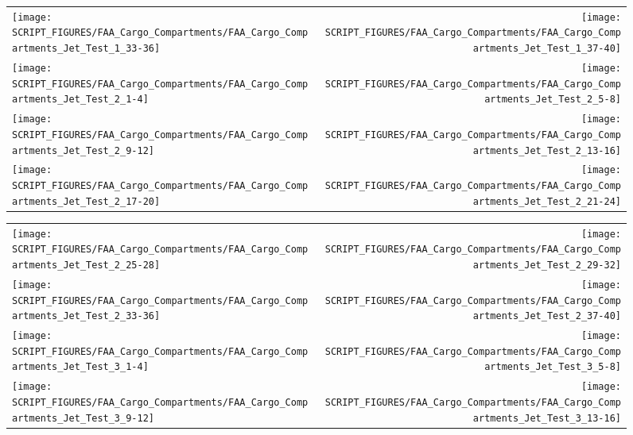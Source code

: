 \begin{figure}[p]
\begin{tabular*}{\textwidth}{l@{\extracolsep{\fill}}r}
\texttt{[image: SCRIPT\_FIGURES/FAA\_Cargo\_Compartments/FAA\_Cargo\_Compartments\_Jet\_Test\_1\_33-36]} &
\texttt{[image: SCRIPT\_FIGURES/FAA\_Cargo\_Compartments/FAA\_Cargo\_Compartments\_Jet\_Test\_1\_37-40]} \\
\texttt{[image: SCRIPT\_FIGURES/FAA\_Cargo\_Compartments/FAA\_Cargo\_Compartments\_Jet\_Test\_2\_1-4]} &
\texttt{[image: SCRIPT\_FIGURES/FAA\_Cargo\_Compartments/FAA\_Cargo\_Compartments\_Jet\_Test\_2\_5-8]} \\
\texttt{[image: SCRIPT\_FIGURES/FAA\_Cargo\_Compartments/FAA\_Cargo\_Compartments\_Jet\_Test\_2\_9-12]} &
\texttt{[image: SCRIPT\_FIGURES/FAA\_Cargo\_Compartments/FAA\_Cargo\_Compartments\_Jet\_Test\_2\_13-16]} \\
\texttt{[image: SCRIPT\_FIGURES/FAA\_Cargo\_Compartments/FAA\_Cargo\_Compartments\_Jet\_Test\_2\_17-20]} &
\texttt{[image: SCRIPT\_FIGURES/FAA\_Cargo\_Compartments/FAA\_Cargo\_Compartments\_Jet\_Test\_2\_21-24]}
\end{tabular*}
\label{FAA_Cargo_HGL_2}
\end{figure}

\begin{figure}[p]
\begin{tabular*}{\textwidth}{l@{\extracolsep{\fill}}r}
\texttt{[image: SCRIPT\_FIGURES/FAA\_Cargo\_Compartments/FAA\_Cargo\_Compartments\_Jet\_Test\_2\_25-28]} &
\texttt{[image: SCRIPT\_FIGURES/FAA\_Cargo\_Compartments/FAA\_Cargo\_Compartments\_Jet\_Test\_2\_29-32]} \\
\texttt{[image: SCRIPT\_FIGURES/FAA\_Cargo\_Compartments/FAA\_Cargo\_Compartments\_Jet\_Test\_2\_33-36]} &
\texttt{[image: SCRIPT\_FIGURES/FAA\_Cargo\_Compartments/FAA\_Cargo\_Compartments\_Jet\_Test\_2\_37-40]} \\
\texttt{[image: SCRIPT\_FIGURES/FAA\_Cargo\_Compartments/FAA\_Cargo\_Compartments\_Jet\_Test\_3\_1-4]} &
\texttt{[image: SCRIPT\_FIGURES/FAA\_Cargo\_Compartments/FAA\_Cargo\_Compartments\_Jet\_Test\_3\_5-8]} \\
\texttt{[image: SCRIPT\_FIGURES/FAA\_Cargo\_Compartments/FAA\_Cargo\_Compartments\_Jet\_Test\_3\_9-12]} &
\texttt{[image: SCRIPT\_FIGURES/FAA\_Cargo\_Compartments/FAA\_Cargo\_Compartments\_Jet\_Test\_3\_13-16]}

\end{tabular*}
\label{FAA_Cargo_HGL_3}
\end{figure}

